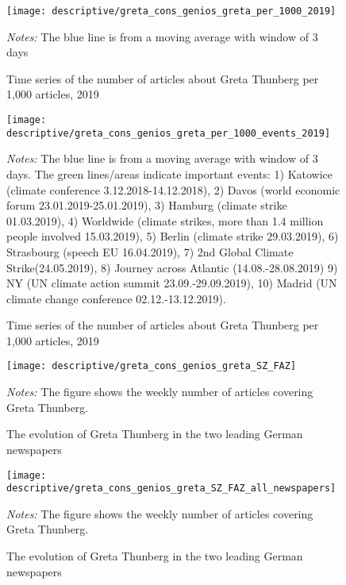 \documentclass[11pt, a4paper]{article} %
\begin{document}
\begin{figure}[H]\centering
	\caption{Time series of the number of articles about Greta Thunberg per 1,000 articles, 2019}
	\texttt{[image: descriptive/greta\_cons\_genios\_greta\_per\_1000\_2019]}
	\begin{minipage}{\linewidth}
		\scriptsize{\emph{Notes:} The blue line is from a moving average with window of 3 days}
	\end{minipage}
\end{figure}


\begin{figure}[H]\centering
	\caption{Time series of the number of articles about Greta Thunberg per 1,000 articles, 2019}
	\texttt{[image: descriptive/greta\_cons\_genios\_greta\_per\_1000\_events\_2019]}
	\begin{minipage}{\linewidth}
		\scriptsize{\emph{Notes:} The blue line is from a moving average with window of 3 days. The green lines/areas indicate important events: 1) Katowice (climate conference 3.12.2018-14.12.2018), 2) Davos (world economic forum 23.01.2019-25.01.2019), 3) Hamburg (climate strike 01.03.2019), 4) Worldwide (climate strikes, more than 1.4 million people involved 15.03.2019), 5) Berlin (climate strike 29.03.2019), 6) Strasbourg (speech EU 16.04.2019), 7) 2nd Global Climate Strike(24.05.2019),	8) Journey across Atlantic (14.08.-28.08.2019) 9) NY (UN climate action summit 23.09.-29.09.2019), 10) Madrid (UN climate change conference 02.12.-13.12.2019).}
	\end{minipage}
\end{figure}


\begin{figure}[H]\centering
	\caption{The evolution of Greta Thunberg in the two leading German newspapers}
	\texttt{[image: descriptive/greta\_cons\_genios\_greta\_SZ\_FAZ]}
	\begin{minipage}{\linewidth}
		\scriptsize{\emph{Notes:} The figure shows the weekly number of articles covering Greta Thunberg.}
	\end{minipage}
\end{figure}
\begin{figure}[H]\centering
	\caption{The evolution of Greta Thunberg in the two leading German newspapers}
	\texttt{[image: descriptive/greta\_cons\_genios\_greta\_SZ\_FAZ\_all\_newspapers]}
	\begin{minipage}{\linewidth}
		\scriptsize{\emph{Notes:} The figure shows the weekly number of articles covering Greta Thunberg.}
	\end{minipage}
\end{figure}
\end{document}
